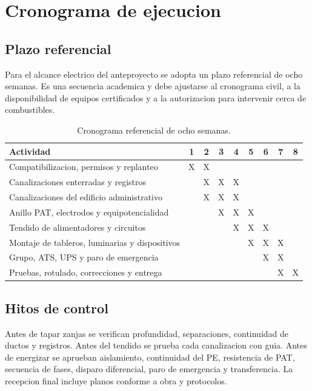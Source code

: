 \chapter{Cronograma de ejecucion}
\thispagestyle{memoria}\pagestyle{memoria}

\section{Plazo referencial}
Para el alcance electrico del anteproyecto se adopta un plazo referencial de ocho
semanas. Es una secuencia academica y debe ajustarse al cronograma civil, a la
disponibilidad de equipos certificados y a la autorizacion para intervenir cerca
de combustibles.

\begin{table}[H]
\centering
\small
\begin{tabularx}{\textwidth}{@{}L*{8}{c}@{}}
\toprule
Actividad & 1 & 2 & 3 & 4 & 5 & 6 & 7 & 8 \\
\midrule
Compatibilizacion, permisos y replanteo & X & X & & & & & & \\
Canalizaciones enterradas y registros & & X & X & X & & & & \\
Canalizaciones del edificio administrativo & & X & X & X & & & & \\
Anillo PAT, electrodos y equipotencialidad & & & X & X & X & & & \\
Tendido de alimentadores y circuitos & & & & X & X & X & & \\
Montaje de tableros, luminarias y dispositivos & & & & & X & X & X & \\
Grupo, ATS, UPS y paro de emergencia & & & & & & X & X & \\
Pruebas, rotulado, correcciones y entrega & & & & & & & X & X \\
\bottomrule
\end{tabularx}
\caption{Cronograma referencial de ocho semanas.}
\end{table}

\section{Hitos de control}
Antes de tapar zanjas se verifican profundidad, separaciones, continuidad de
ductos y registros. Antes del tendido se prueba cada canalizacion con guia. Antes
de energizar se aprueban aislamiento, continuidad del PE, resistencia de PAT,
secuencia de fases, disparo diferencial, paro de emergencia y transferencia. La
recepcion final incluye planos conforme a obra y protocolos.
